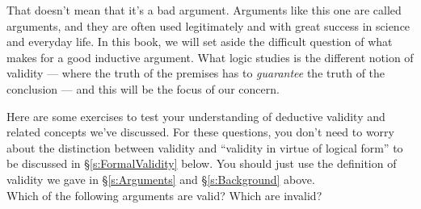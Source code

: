 That doesn't mean that it's a bad argument.  Arguments like this one are called  arguments, and they are often used legitimately and with great success in science and everyday life.  In this book, we will set aside  the difficult question of what makes for a good inductive argument.  What logic studies is the different notion of  validity --- where the truth of the premises has to \emph{guarantee} the truth of the conclusion --- and this will be the focus of our concern.

\practiceproblems

Here are some exercises to test your understanding of deductive validity and related concepts we've discussed.  For these questions, you don't need to worry about the distinction between validity and ``validity in virtue of logical form'' to be discussed in \S\ref{s:FormalValidity}  below.  You should just use the definition of validity we gave in \S\ref{s:Arguments} and \S \ref{s:Background} above.\\


\problempart  Which of the following arguments are valid? Which are invalid?


